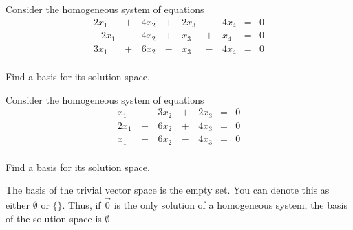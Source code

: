 \begin{activity}{10}
Consider the homogeneous system of equations
\begin{alignat*}{5}
2x_1&\,+\,&4x_2&\,+\,& 2x_3&\,-\,&4x_4  &=& 0 \\
-2x_1&\,-\,&4x_2&\,+\,&x_3 &\,+\,& x_4 &=& 0 \\
3x_1&\,+\,&6x_2&\,-\,&x_3 &\,-\,&4 x_4 &=& 0 \\
\end{alignat*}

Find a basis for its solution space.
\end{activity}

\begin{activity}{5}
Consider the homogeneous system of equations
\begin{alignat*}{5}
x_1&\,-\,&3x_2&\,+\,& 2x_3  &=& 0 \\
2x_1&\,+\,&6x_2&\,+\,&4x_3  &=& 0 \\
x_1&\,+\,&6x_2&\,-\,&4x_3 &=& 0 \\
\end{alignat*}

Find a basis for its solution space.
\end{activity}

\begin{observation}
The basis of the trivial vector space is the empty set.  You can denote this as either \(\emptyset\) or \(\{\}\).
\vfill
Thus, if \(\vec{0}\) is the only solution of a homogeneous system, the basis of the solution space is  \(\emptyset\).
\end{observation}
